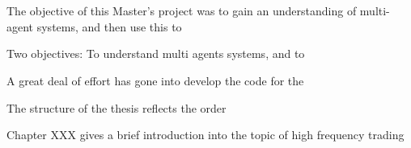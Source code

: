 
\chapter{} %

\label{chapter:summary} %




\section{}
The objective of this Master's project was to gain an understanding of multi-agent systems, and then use this to 

Two objectives: To understand multi agents systems, and to 

A great deal of effort has gone into develop the code for the 

The structure of the thesis reflects the order 

Chapter XXX gives a brief introduction into the topic of high frequency trading



